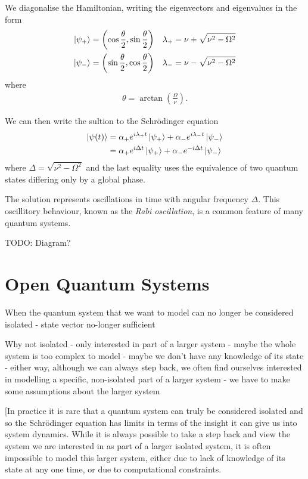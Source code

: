 We diagonalise the Hamiltonian, writing the eigenvectors and eigenvalues in the form
\begin{align}
  \left\vert\psi_+\right\rangle &=  \left(\cos\frac{\theta}{2}, \sin\frac{\theta}{2}\right)  &\lambda_{+} = \nu + \sqrt{\nu^2 - \Omega^2} \\
  \left\vert\psi_-\right\rangle &=  \left(\sin\frac{\theta}{2}, \cos\frac{\theta}{2}\right)  &\lambda_{-} = \nu - \sqrt{\nu^2 - \Omega^2} 
\end{align}
where
\begin{align}
  \theta = \arctan\left(\frac{\Omega}{\nu}\right).
\end{align}

We can then write the sultion to the Schr\"odinger equation
\begin{align}
  \left\vert\psi(t)\right\rangle &= \alpha_{+} e^{i\lambda_{+}t}\left\vert\psi_{+}\right\rangle +  \alpha_{-} e^{i\lambda_{-}t} \left\vert\psi_{-}\right\rangle \\
  &= \alpha_{+} e^{i\Delta t}\left\vert\psi_{+}\right\rangle +  \alpha_{-} e^{- i\Delta t} \left\vert\psi_{-}\right\rangle 
\end{align}
where $\Delta = \sqrt{\nu^2 - \Omega^2}$ and the last equality uses the equivalence of two quantum states differing only by a global phase. 

The solution represents oscillations in time with angular frequency $\Delta$. This oscillitory behaviour, known as the \textit{Rabi oscillation}, is a common feature of many quantum systems.

TODO: Diagram?

\section{Open Quantum Systems}

When the quantum system that we want to model can no longer be considered isolated
- state vector no-longer sufficient

Why not isolated
- only interested in part of a larger system
- maybe the whole system is too complex to model
- maybe we don't have any knowledge of its state
- either way, although we can always step back, we often find ourselves interested in modelling a specific, non-isolated part of a larger system
- we have to make some assumptions about the larger system


[In practice it is rare that a quantum system can truly be considered isolated and so the Schr\"{o}dinger equation has limits in terms of the insight it can give us into system dynamics. While it is always possible to take a step back and view the system we are interested in as part of a larger isolated system, it is often impossible to model this larger system, either due to lack of knowledge of its state at any one time, or due to computational constraints.

